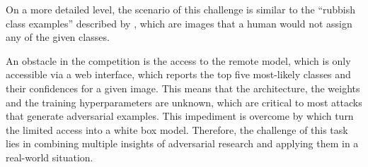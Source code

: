 On a more detailed level, the scenario of this challenge is similar to the \enquote{rubbish class examples} described by \citet{szegedy2015explaining}, which are images that a human would not assign any of the given classes.

An obstacle in the competition is the access to the remote model, which is only accessible via a web interface,
which reports the top five most-likely classes and their confidences for a given image.
This means that the architecture, the weights and the training hyperparameters are unknown, which are critical to most attacks that generate adversarial examples.
This impediment is overcome by \citet{papernot2017practical} which turn the limited access into a white box model.
Therefore, the challenge of this task lies in combining multiple insights of adversarial research and applying them in a real-world situation.

